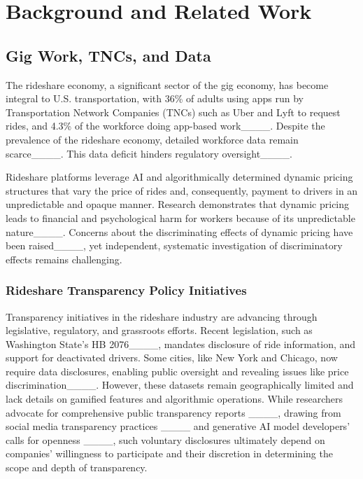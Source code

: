 \section{Background and Related Work}
\label{sec:background-related-work}


\subsection{Gig Work, TNCs, and Data}


The rideshare economy, a significant sector of the gig economy, has become integral to U.S. transportation, with 36\% of adults using apps run by Transportation Network Companies (TNCs) such as Uber and Lyft to request rides, and 4.3\% of the workforce doing app-based work____. Despite the prevalence of the rideshare economy, detailed workforce data remain scarce____. This data deficit hinders regulatory oversight____. 

Rideshare platforms leverage AI and algorithmically determined dynamic pricing structures that vary the price of rides and, consequently, payment to drivers in an unpredictable and opaque manner. Research demonstrates that dynamic pricing leads to financial and psychological harm for workers because of its unpredictable nature____. Concerns about the discriminating effects of dynamic pricing have been raised____, yet independent, systematic investigation of discriminatory effects remains challenging. 

\subsubsection{Rideshare Transparency Policy Initiatives}
Transparency initiatives in the rideshare industry are advancing through legislative, regulatory, and grassroots efforts. Recent legislation, such as Washington State's HB 2076____, mandates disclosure of ride information, and support for deactivated drivers. Some cities, like New York and Chicago, now require data disclosures, enabling public oversight and revealing issues like price discrimination____. However, these datasets remain geographically limited and lack details on gamified features and algorithmic operations. 
While researchers advocate for comprehensive public transparency reports ____, drawing from social media transparency practices ____ and generative AI model developers' calls for openness ____, such voluntary disclosures ultimately depend on companies' willingness to participate and their discretion in determining the scope and depth of transparency. 

